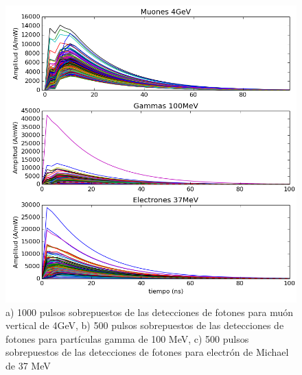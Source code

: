 \documentclass{book}
\begin{document}
\begin{figure}[h] %
\begin{center}
 \includegraphics[width=\linewidth]{2000Pulsos.png}
\caption{a) 1000 pulsos sobrepuestos de las detecciones de fotones para mu\'on vertical de 4GeV, b) 500 pulsos sobrepuestos de las detecciones de fotones para part\'iculas gamma de 100 MeV, c) 500 pulsos sobrepuestos de las detecciones de fotones para electr\'on de Michael de 37 MeV}
\end{center}
\end{figure}
\end{document}
